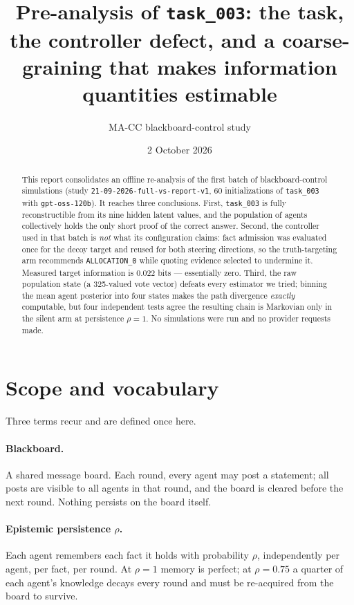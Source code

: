 \documentclass[11pt,a4paper]{article}
\title{\textbf{Pre-analysis of \texttt{task\_003}: the task, the controller
defect, and a coarse-graining that makes information quantities estimable}}
\author{MA-CC blackboard-control study}
\date{2 October 2026}
\newcommand{\A}[1]{\texttt{ALLOCATION\_#1}}
\begin{document}
\maketitle

\begin{abstract}
\noindent
This report consolidates an offline re-analysis of the first batch of
blackboard-control simulations (study \texttt{21-09-2026-full-vs-report-v1}, 60
initializations of \texttt{task\_003} with \texttt{gpt-oss-120b}). It reaches
three conclusions. First, \texttt{task\_003} is fully reconstructible from its
nine hidden latent values, and the population of agents collectively holds the
only short proof of the correct answer. Second, the controller used in that
batch is \emph{not} what its configuration claims: fact admission was evaluated
once for the decoy target and reused for both steering directions, so the
truth-targeting arm recommends \A{0} while quoting evidence selected to
undermine it. Measured target information is $0.022$ bits --- essentially zero.
Third, the raw population state (a 325-valued vote vector) defeats every
estimator we tried; binning the mean agent posterior into four states makes the
path divergence \emph{exactly} computable, but four independent tests agree the
resulting chain is Markovian only in the silent arm at persistence $\rho = 1$.
No simulations were run and no provider requests made.
\end{abstract}

\tableofcontents

\section{Scope and vocabulary}

Three terms recur and are defined once here.

\paragraph{Blackboard.} A shared message board. Each round, every agent may post
a statement; all posts are visible to all agents in that round, and the board is
cleared before the next round. Nothing persists on the board itself.

\paragraph{Epistemic persistence $\rho$.} Each agent remembers each fact it holds
with probability $\rho$, independently per agent, per fact, per round. At
$\rho = 1$ memory is perfect; at $\rho = 0.75$ a quarter of each agent's
knowledge decays every round and must be re-acquired from the board to survive.
\end{document}
